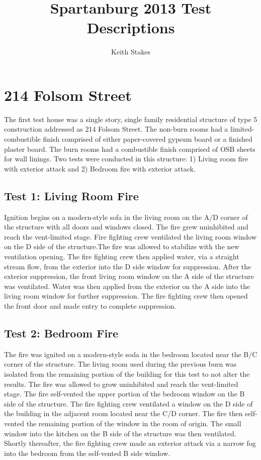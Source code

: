 \documentclass{article}
\title{Spartanburg 2013 Test Descriptions}
\author{Keith Stakes}
\begin{document}
\maketitle

\section{214 Folsom Street}

The first test house was a single story, single family residential structure of type 5 construction addressed as 214 Folsom Street. The non-burn rooms had a limited-combustible finish comprised of either paper-covered gypsum board or a finished plaster board.  The burn rooms had a combustible finish comprised of OSB sheets for wall linings.  Two tests were conducted in this structure: 1) Living room fire with exterior attack and 2) Bedroom fire with exterior attack.

\subsection{Test 1: Living Room Fire}

Ignition begins on a modern-style sofa in the living room on the A/D corner of the structure with all doors and windows closed. The fire grew uninhibited and reach the vent-limited stage. Fire fighting crew ventilated the living room window on the D side of the structure.The fire was allowed to stabilize with the new ventilation opening. The fire fighting crew then applied water, via a straight stream flow, from the exterior into the D side window for suppression.  After the exterior suppression, the front living room window on the A side of the structure was ventilated.  Water was then applied from the exterior on the A side into the living room window for further suppression. The fire fighting crew then opened the front door and made entry to complete suppression.

\subsection{Test 2: Bedroom Fire}

The fire was ignited on a modern-style soda in the bedroom located near the B/C corner of the structure.  The living room used during the previous burn was isolated from the remaining portion of the building for this test to not alter the results. The fire was allowed to grow uninhibited and reach the vent-limited stage. The fire self-vented the upper portion of the bedroom window on the B side of the structure.  The fire fighting crew ventilated a window on the D side of the building in the adjacent room located near the C/D corner.  The fire then self-vented the remaining portion of the window in the room of origin.  The small window into the kitchen on the B side of the structure was then ventilated.  Shortly thereafter, the fire fighting crew made an exterior attack via a narrow fog into the bedroom from the self-vented B side window.
\end{document}
